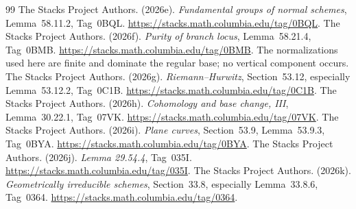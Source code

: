 \documentclass[11pt]{article}
\begin{document}
\begin{thebibliography}{99}
The Stacks Project Authors. (2026e). \emph{Fundamental groups of normal schemes}, Lemma~58.11.2, Tag~0BQL. \url{https://stacks.math.columbia.edu/tag/0BQL}.
The Stacks Project Authors. (2026f). \emph{Purity of branch locus}, Lemma~58.21.4, Tag~0BMB. \url{https://stacks.math.columbia.edu/tag/0BMB}. The normalizations used here are finite and dominate the regular base; no vertical component occurs.
The Stacks Project Authors. (2026g). \emph{Riemann--Hurwitz}, Section~53.12, especially Lemma~53.12.2, Tag~0C1B. \url{https://stacks.math.columbia.edu/tag/0C1B}.
The Stacks Project Authors. (2026h). \emph{Cohomology and base change, III}, Lemma~30.22.1, Tag~07VK. \url{https://stacks.math.columbia.edu/tag/07VK}.
The Stacks Project Authors. (2026i). \emph{Plane curves}, Section~53.9, Lemma~53.9.3, Tag~0BYA. \url{https://stacks.math.columbia.edu/tag/0BYA}.
The Stacks Project Authors. (2026j). \emph{Lemma 29.54.4}, Tag~035I. \url{https://stacks.math.columbia.edu/tag/035I}.
The Stacks Project Authors. (2026k). \emph{Geometrically irreducible schemes}, Section~33.8, especially Lemma~33.8.6, Tag~0364. \url{https://stacks.math.columbia.edu/tag/0364}.
\end{thebibliography}
\end{document}
